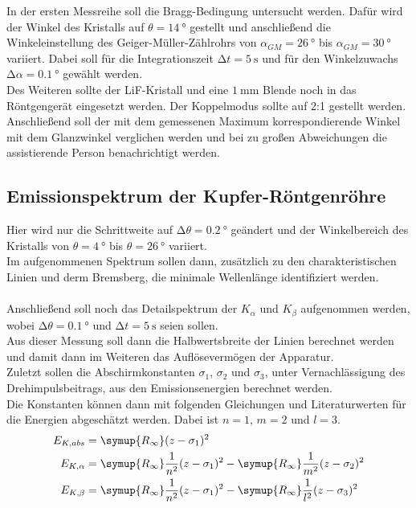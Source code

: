 In der ersten Messreihe soll die Bragg-Bedingung untersucht werden. 
Dafür wird der Winkel des Kristalls auf $\theta=\SI{14}{\degree}$ gestellt und anschließend die Winkeleinstellung des Geiger-Müller-Zählrohrs von $\alpha_{GM}=\SI{26}{\degree}$ bis $\alpha_{GM}=\SI{30}{\degree}$ variiert.
Dabei soll für die Integrationszeit $\increment t=\SI{5}{\second}$ und für den Winkelzuwachs $\increment \alpha=\SI{0.1}{\degree}$ gewählt werden.\\
Des Weiteren sollte der LiF-Kristall und eine $\SI{1}{\milli\metre}$ Blende noch in das Röntgengerät eingesetzt werden.
Der Koppelmodus sollte auf 2:1 gestellt werden.\\
Anschließend soll der mit dem gemessenen Maximum korrespondierende Winkel mit dem Glanzwinkel verglichen werden und bei zu großen Abweichungen die assistierende Person benachrichtigt werden.

\subsection{Emissionspektrum der Kupfer-Röntgenröhre}

\noindent
Hier wird nur die Schrittweite auf $\increment \theta=\SI{0.2}{\degree}$ geändert und der Winkelbereich des Kristalls von $\theta=\SI{4}{\degree}$ bis $\theta=\SI{26}{\degree}$ variiert.\\
Im aufgenommenen Spektrum sollen dann, zusätzlich zu den charakteristischen Linien und derm Bremsberg, die minimale Wellenlänge identifiziert werden.\\\\
Anschließend soll noch das Detailspektrum der $K_{\alpha}$ und $K_{\beta}$ aufgenommen werden, wobei $\increment \theta=\SI{0.1}{\degree}$ und $\increment t=\SI{5}{\second}$ seien sollen.\\
Aus dieser Messung soll dann die Halbwertsbreite der Linien berechnet werden und damit dann im Weiteren das Auflösevermögen der Apparatur.\\
Zuletzt sollen die Abschirmkonstanten $\sigma_1$, $\sigma_2$ und $\sigma_3$, unter Vernachlässigung des Drehimpulsbeitrags, aus den Emissionsenergien berechnet werden. \\
Die Konstanten können dann mit folgenden Gleichungen und Literaturwerten für die Energien\cite{E_abs} abgeschätzt werden. Dabei ist $n=1$, $m=2$ und $l=3$.
\begin{align*}
    E_{K,abs}&=\symup{R_\infty}(z-\sigma_1)^2\\
    E_{K,\alpha}&=\symup{R_\infty}\frac{1}{n^2}(z-\sigma_1)^2-\symup{R_\infty}\frac{1}{m^2}(z-\sigma_2)^2\\
    E_{K,\beta}&=\symup{R_\infty}\frac{1}{n^2}(z-\sigma_1)^2-\symup{R_\infty}\frac{1}{l^2}(z-\sigma_3)^2
\end{align*}

